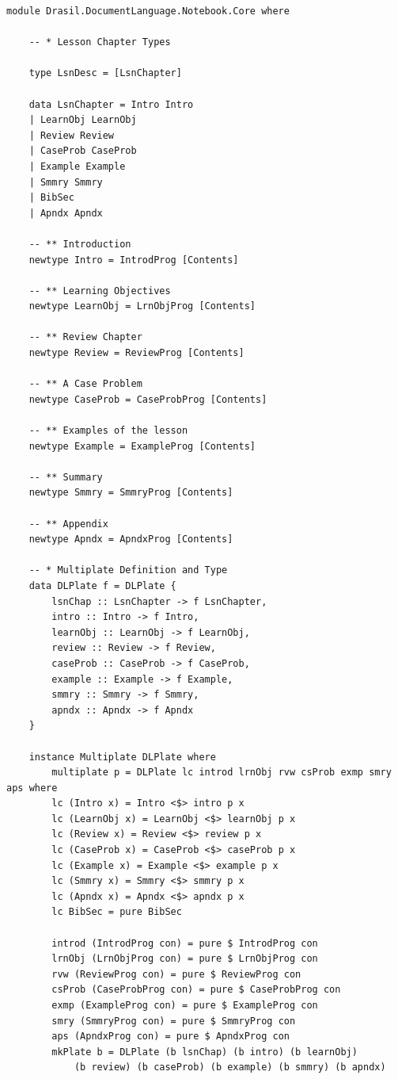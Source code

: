 \begin{lstlisting}[language=haskell1, 
	basicstyle=\linespread{1.1}\small\ttfamily]
	module Drasil.DocumentLanguage.Notebook.Core where
	
	-- * Lesson Chapter Types
	
	type LsnDesc = [LsnChapter]
	
	data LsnChapter = Intro Intro
	| LearnObj LearnObj
	| Review Review
	| CaseProb CaseProb
	| Example Example
	| Smmry Smmry
	| BibSec
	| Apndx Apndx
	
	-- ** Introduction
	newtype Intro = IntrodProg [Contents]
	
	-- ** Learning Objectives
	newtype LearnObj = LrnObjProg [Contents]
	
	-- ** Review Chapter
	newtype Review = ReviewProg [Contents]
	
	-- ** A Case Problem
	newtype CaseProb = CaseProbProg [Contents]
	
	-- ** Examples of the lesson
	newtype Example = ExampleProg [Contents]
	
	-- ** Summary
	newtype Smmry = SmmryProg [Contents]
	
	-- ** Appendix
	newtype Apndx = ApndxProg [Contents]
	
	-- * Multiplate Definition and Type	
	data DLPlate f = DLPlate {
		lsnChap :: LsnChapter -> f LsnChapter,
		intro :: Intro -> f Intro,
		learnObj :: LearnObj -> f LearnObj,
		review :: Review -> f Review,
		caseProb :: CaseProb -> f CaseProb,
		example :: Example -> f Example,
		smmry :: Smmry -> f Smmry,
		apndx :: Apndx -> f Apndx
	}
	
	instance Multiplate DLPlate where
		multiplate p = DLPlate lc introd lrnObj rvw csProb exmp smry aps where
		lc (Intro x) = Intro <$> intro p x
		lc (LearnObj x) = LearnObj <$> learnObj p x
		lc (Review x) = Review <$> review p x
		lc (CaseProb x) = CaseProb <$> caseProb p x
		lc (Example x) = Example <$> example p x
		lc (Smmry x) = Smmry <$> smmry p x
		lc (Apndx x) = Apndx <$> apndx p x
		lc BibSec = pure BibSec
	
		introd (IntrodProg con) = pure $ IntrodProg con 
		lrnObj (LrnObjProg con) = pure $ LrnObjProg con 
		rvw (ReviewProg con) = pure $ ReviewProg con
		csProb (CaseProbProg con) = pure $ CaseProbProg con 
		exmp (ExampleProg con) = pure $ ExampleProg con
		smry (SmmryProg con) = pure $ SmmryProg con 
		aps (ApndxProg con) = pure $ ApndxProg con
		mkPlate b = DLPlate (b lsnChap) (b intro) (b learnObj) 
			(b review) (b caseProb) (b example) (b smmry) (b apndx)
\end{lstlisting}

